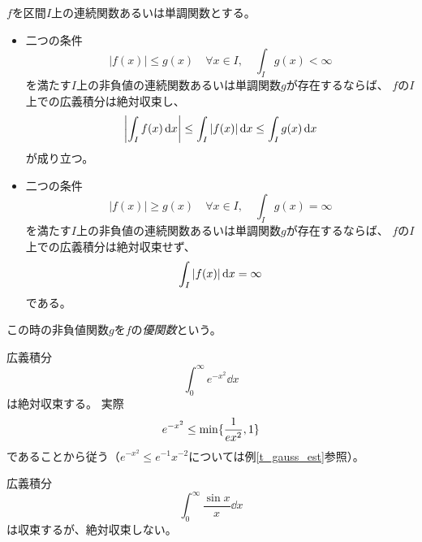 \begin{proposition}[広義積分の比較判定法]
$f$を区間$I$上の連続関数あるいは単調関数とする。
\begin{itemize}
\item
二つの条件
$$
|f(x)| \le g(x) \quad \forall x \in I,
\quad \int_I g(x) < \infty
$$
を満たす$I$上の非負値の連続関数あるいは単調関数$g$が存在するならば、
$f$の$I$上での広義積分は絶対収束し、
$$
\abs{\int_I f(x)\dd{x}} \le \int_I \abs{f(x)}\dd{x} \le \int_I g(x)\dd{x}
$$
が成り立つ。
\item
二つの条件
$$
|f(x)| \ge g(x) \quad \forall x \in I,
\quad \int_I g(x) = \infty
$$
を満たす$I$上の非負値の連続関数あるいは単調関数$g$が存在するならば、
$f$の$I$上での広義積分は絶対収束せず、
$$
\int_I \abs{f(x)}\dd{x} = \infty
$$
である。
\end{itemize}
\end{proposition}

\begin{remark}
この時の非負値関数$g$を$f$の\emph{優関数}という。
\end{remark}

\begin{example}
広義積分
$$
\int_0^\infty e^{-x^2}\dd{x}
$$
は絶対収束する。
実際
$$
e^{-x^2} \le \min\{ \frac{1}{e x^2}, 1 \}
$$
であることから従う（$e^{-x^2} \le e^{-1}x^{-2}$については例\ref{t_gauss_est}参照）。
\end{example}

\begin{example}
広義積分
$$
\int_0^\infty \frac{\sin x}{x}\dd{x}
$$
は収束するが、絶対収束しない。
\end{example}
